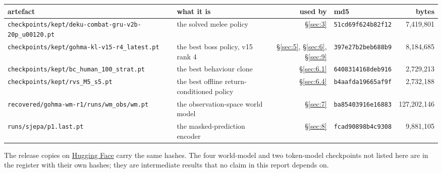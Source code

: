 \documentclass[11pt]{article}
\begin{document}
\begin{table}[!htbp]
  \centering
  \label{tab:thesixmodelsthereportsclaims}
\begin{center}\small
\begin{tabularx}{\linewidth}{@{}XXrXr@{}}
\toprule
\textbf{artefact} & \textbf{what it is} & \textbf{used by} & \textbf{md5} & \textbf{bytes} \\
\midrule
\texttt{checkpoints/\allowbreak{}kept/\allowbreak{}deku-\allowbreak{}combat-\allowbreak{}gru-\allowbreak{}v2b-\allowbreak{}20p\_\allowbreak{}u00120.pt} & the solved melee policy & \S\ref{sec:3} & \texttt{51cd69f624b82f12} & 7,419,801 \\
\texttt{checkpoints/\allowbreak{}kept/\allowbreak{}gohma-\allowbreak{}kl-\allowbreak{}v15-\allowbreak{}r4\_\allowbreak{}latest.pt} & the best boss policy, v15 rank 4 & \S\ref{sec:5}, \S\ref{sec:6}, \S\ref{sec:9} & \texttt{397e27b2beb688b9} & 8,184,685 \\
\texttt{checkpoints/\allowbreak{}kept/\allowbreak{}bc\_\allowbreak{}human\_\allowbreak{}100\_\allowbreak{}strat.pt} & the best behaviour clone & \S\ref{sec:6.1} & \texttt{6408314168deb916} & 2,729,213 \\
\texttt{checkpoints/\allowbreak{}kept/\allowbreak{}rvs\_\allowbreak{}M5\_\allowbreak{}s5.pt} & the best offline return-conditioned policy & \S\ref{sec:6.4} & \texttt{b4aafda19665af9f} & 2,732,188 \\
\texttt{recovered/\allowbreak{}gohma-\allowbreak{}wm-\allowbreak{}r1/\allowbreak{}runs/\allowbreak{}wm\_\allowbreak{}obs/\allowbreak{}wm.pt} & the observation-space world model & \S\ref{sec:7} & \texttt{ba85403916e16883} & 127,202,146 \\
\texttt{runs/sjepa/p1.last.pt} & the masked-prediction encoder & \S\ref{sec:8} & \texttt{fcad90898b4c9308} & 9,881,105 \\
\bottomrule
\end{tabularx}
\end{center}
\end{table}

The release copies on \href{https://huggingface.co/jordykieto/ppo-hyrule}{Hugging Face} carry the same hashes. The four world-model and two token-model checkpoints not listed here are in the register with their own hashes; they are intermediate results that no claim in this report depends on.
\end{document}
